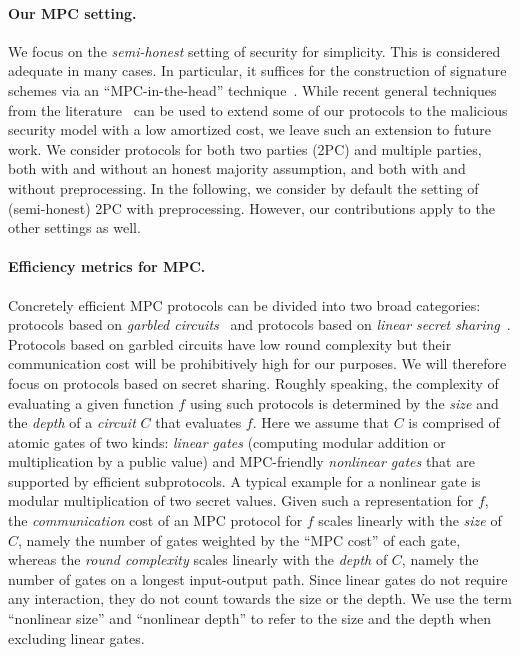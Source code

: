 \paragraph{Our MPC setting.} We focus on the {\em semi-honest} setting of security for simplicity. This is considered adequate in many cases. In particular, it suffices for the construction of signature
schemes via an ``MPC-in-the-head'' technique~\cite{ishai2007-zkmpc,chase2017-picnic}.
While recent general techniques from the literature~\cite{BBCGI19,BGIN19} can be used to extend some of our protocols to the malicious security model with a low amortized cost, we leave such an extension to future work. We consider protocols for both two parties (2PC) and multiple parties, both with and without an honest majority assumption, and both with and without preprocessing. In the following, we consider by default the setting of (semi-honest) 2PC with preprocessing. However, our contributions apply to the other settings as well.

\paragraph{Efficiency metrics for MPC.}   Concretely efficient MPC protocols can be divided into two broad categories: protocols based on {\em garbled circuits}~\cite{Yao} and protocols based on {\em linear secret sharing}~\cite{GMW,BGW,CCD}. Protocols based on garbled circuits have low round complexity but their communication cost will be prohibitively high for our purposes. We will therefore focus on protocols based on secret sharing. Roughly speaking, the complexity of evaluating  a given function $f$ using such protocols is determined by the {\em size} and the {\em depth} of a {\em circuit} $C$ that evaluates $f$.  Here we assume that $C$ is comprised of atomic gates of two kinds: {\em linear gates} (computing modular addition or multiplication by a public value) and MPC-friendly {\em nonlinear gates}  that are supported by efficient subprotocols. A typical example for a nonlinear gate is modular multiplication of two secret values. Given such a representation for $f$, the {\em communication} cost of an MPC protocol for $f$ scales linearly with the {\em size} of $C$, namely the number of gates weighted by the ``MPC cost'' of each gate, whereas the {\em round complexity} scales linearly with the {\em depth} of $C$, namely the number of gates on a longest input-output path. Since linear gates do not require any interaction, they do not count towards the size or the depth. We use the term ``nonlinear size'' and ``nonlinear depth'' to refer to the size and the depth when excluding linear gates.

